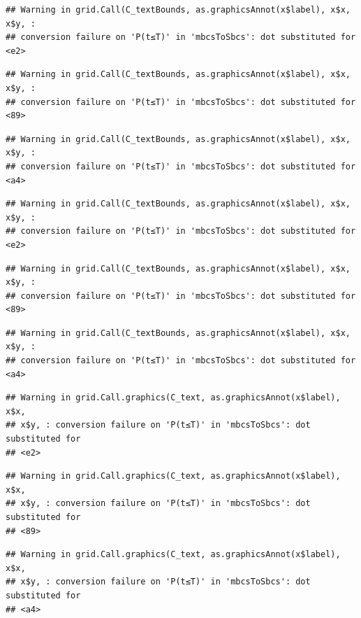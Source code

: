 \documentclass[]{book}
\begin{document}
\begin{verbatim}
## Warning in grid.Call(C_textBounds, as.graphicsAnnot(x$label), x$x, x$y, :
## conversion failure on 'P(t≤T)' in 'mbcsToSbcs': dot substituted for <e2>
\end{verbatim}

\begin{verbatim}
## Warning in grid.Call(C_textBounds, as.graphicsAnnot(x$label), x$x, x$y, :
## conversion failure on 'P(t≤T)' in 'mbcsToSbcs': dot substituted for <89>
\end{verbatim}

\begin{verbatim}
## Warning in grid.Call(C_textBounds, as.graphicsAnnot(x$label), x$x, x$y, :
## conversion failure on 'P(t≤T)' in 'mbcsToSbcs': dot substituted for <a4>
\end{verbatim}

\begin{verbatim}
## Warning in grid.Call(C_textBounds, as.graphicsAnnot(x$label), x$x, x$y, :
## conversion failure on 'P(t≤T)' in 'mbcsToSbcs': dot substituted for <e2>
\end{verbatim}

\begin{verbatim}
## Warning in grid.Call(C_textBounds, as.graphicsAnnot(x$label), x$x, x$y, :
## conversion failure on 'P(t≤T)' in 'mbcsToSbcs': dot substituted for <89>
\end{verbatim}

\begin{verbatim}
## Warning in grid.Call(C_textBounds, as.graphicsAnnot(x$label), x$x, x$y, :
## conversion failure on 'P(t≤T)' in 'mbcsToSbcs': dot substituted for <a4>
\end{verbatim}

\begin{verbatim}
## Warning in grid.Call.graphics(C_text, as.graphicsAnnot(x$label), x$x,
## x$y, : conversion failure on 'P(t≤T)' in 'mbcsToSbcs': dot substituted for
## <e2>
\end{verbatim}

\begin{verbatim}
## Warning in grid.Call.graphics(C_text, as.graphicsAnnot(x$label), x$x,
## x$y, : conversion failure on 'P(t≤T)' in 'mbcsToSbcs': dot substituted for
## <89>
\end{verbatim}

\begin{verbatim}
## Warning in grid.Call.graphics(C_text, as.graphicsAnnot(x$label), x$x,
## x$y, : conversion failure on 'P(t≤T)' in 'mbcsToSbcs': dot substituted for
## <a4>
\end{verbatim}
\end{document}
